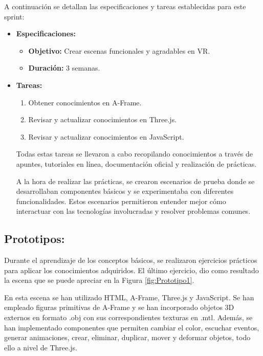 \documentclass[a4paper, 12pt]{book}
\begin{document}
    A continuación se detallan las especificaciones y tareas establecidas para este sprint:
        \begin{itemize}
            \item \textbf{Especificaciones:}
            \begin{itemize}
                \item \textbf{Objetivo:} Crear escenas funcionales y agradables en VR.
                \item \textbf{Duración:} 3 semanas.
            \end{itemize}
            
            \item \textbf{Tareas:}
            \begin{enumerate}
                \item Obtener conocimientos en A-Frame.
                \item Revisar y actualizar conocimientos en Three.js.
                \item Revisar y actualizar conocimientos en JavaScript.
            \end{enumerate}

            Todas estas tareas se llevaron a cabo recopilando conocimientos a través de apuntes, tutoriales en línea, documentación oficial y realización de prácticas.

            A la hora de realizar las prácticas, se crearon escenarios de prueba donde se desarrollaban componentes básicos y se experimentaba con diferentes funcionalidades. Estos escenarios permitieron entender mejor cómo interactuar con las tecnologías involucradas y resolver problemas comunes.
           \end{itemize} 

            \subsection{Prototipos:}

            Durante el aprendizaje de los conceptos básicos, se realizaron ejercicios prácticos para aplicar los conocimientos adquiridos. El último ejercicio, dio como resultado la escena que se puede apreciar en la Figura  \ref{fig:Prototipo1}.

            En esta escena se han utilizado HTML, A-Frame, Three.js y JavaScript. Se han empleado figuras primitivas de A-Frame y se han incorporado objetos 3D externos en formato .obj con sus correspondientes texturas en .mtl. Además, se han implementado componentes que permiten cambiar el color, escuchar eventos, generar animaciones, crear, eliminar, duplicar, mover y deformar objetos, todo ello a nivel de Three.js.
\end{document}
